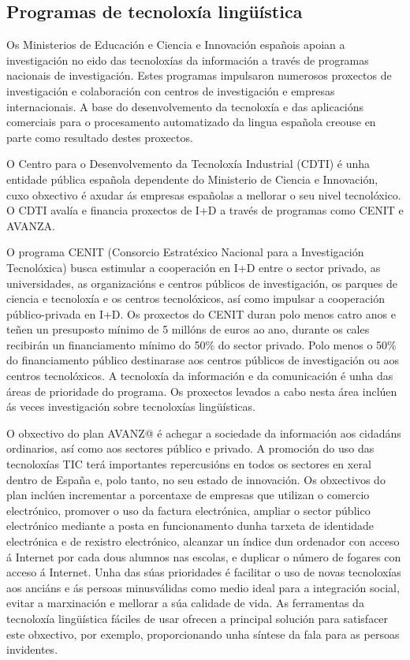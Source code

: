 \begin{multicols}{2}
\subsection{Programas de tecnoloxía lingüística}

   Os Ministerios de Educación e Ciencia e Innovación españois apoian a investigación no eido das tecnoloxías da información a través de programas nacionais de investigación. Estes programas impulsaron numerosos proxectos de investigación e colaboración con centros de investigación e empresas internacionais. A base do desenvolvemento da tecnoloxía e das aplicacións comerciais para o procesamento automatizado da lingua española creouse en parte como resultado destes proxectos.
	
O Centro para o Desenvolvemento da Tecnoloxía Industrial (CDTI) é unha entidade pública española dependente do Ministerio de Ciencia e Innovación, cuxo obxectivo é axudar ás empresas españolas a mellorar o seu nivel tecnolóxico. O CDTI avalía e financia proxectos de I+D a través de programas como CENIT e AVANZA.

O programa CENIT (Consorcio Estratéxico Nacional para a Investigación Tecnolóxica) busca estimular a cooperación en I+D entre o sector privado, as universidades, as organizacións e centros públicos de investigación, os parques de ciencia e tecnoloxía e os centros tecnolóxicos, así como impulsar a cooperación público-privada en I+D. Os proxectos do CENIT duran polo menos catro anos e teñen un presuposto mínimo de 5 millóns de euros ao ano, durante os cales recibirán un financiamento mínimo do 50\% do sector privado. Polo menos o 50\% do financiamento público destinarase aos centros públicos de investigación ou aos centros tecnolóxicos. A tecnoloxía da información e da comunicación é unha das áreas de prioridade do programa. Os proxectos levados a cabo nesta área inclúen ás veces investigación sobre tecnoloxías lingüísticas. 

O obxectivo do plan AVANZ@ é achegar a sociedade da información aos cidadáns ordinarios, así como aos sectores público e privado. A promoción do uso das tecnoloxías TIC terá importantes repercusións en todos os sectores en xeral dentro de España e, polo tanto, no seu estado de innovación. Os obxectivos do plan inclúen incrementar a porcentaxe de empresas que utilizan o comercio electrónico, promover o uso da factura electrónica, ampliar o sector público electrónico mediante a posta en funcionamento dunha tarxeta de identidade electrónica e de rexistro electrónico, alcanzar un índice dun ordenador con acceso á Internet por cada dous alumnos nas escolas, e duplicar o número de fogares con acceso á Internet. Unha das súas prioridades é facilitar o uso de novas tecnoloxías aos anciáns e ás persoas minusválidas como medio ideal para a integración social, evitar a marxinación e mellorar a súa calidade de vida. As ferramentas da tecnoloxía lingüística fáciles de usar ofrecen a principal solución para satisfacer este obxectivo, por exemplo, proporcionando unha síntese da fala para as persoas invidentes.


\end{multicols}
